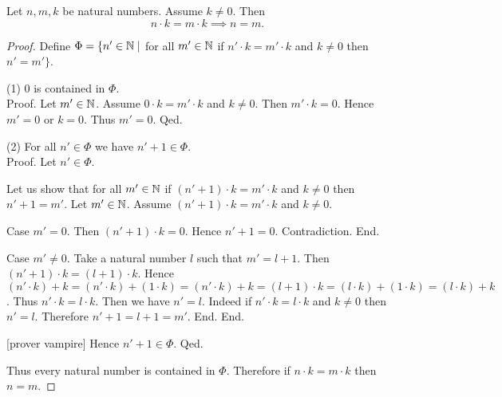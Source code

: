 \documentclass[../arithmetic.tex]{subfiles}
\begin{document}
  \begin{forthel}
    \begin{proposition}
      Let $n, m, k$ be natural numbers.
      Assume $k \neq 0$.
      Then \[ n \cdot k = m \cdot k \implies n = m. \]
    \end{proposition}
    \begin{proof}
      Define $\Phi = \{ n' \in \mathbb{N} \mid$ for all $m' \in \mathbb{N}$ if
      $n' \cdot k = m' \cdot k$ and $k \neq 0$ then $n' = m' \}$.

      (1) $0$ is contained in $\Phi$. \\
      Proof.
        Let $m' \in \mathbb{N}$.
        Assume $0 \cdot k = m' \cdot k$ and $k \neq 0$.
        Then $m' \cdot k = 0$.
        Hence $m' = 0$ or $k = 0$.
        Thus $m' = 0$.
      Qed.

      (2) For all $n' \in \Phi$ we have $n' \plus 1 \in \Phi$. \\
      Proof.
        Let $n' \in \Phi$.

        Let us show that for all $m' \in \mathbb{N}$ if $(n' \plus 1) \cdot k =
        m' \cdot k$ and $k \neq 0$ then $n' \plus 1 = m'$.
          Let $m' \in \mathbb{N}$.
          Assume $(n' \plus 1) \cdot k = m' \cdot k$ and $k \neq 0$.

          Case $m' = 0$.
            Then $(n' \plus 1) \cdot k = 0$.
            Hence $n' \plus 1 = 0$.
            Contradiction.
          End.

          Case $m' \neq 0$.
            Take a natural number $l$ such that $m' = l \plus 1$.
            Then $(n' \plus 1) \cdot k = (l \plus 1) \cdot k$.
            Hence $(n' \cdot k) \plus k
              = (n' \cdot k) \plus (1 \cdot k)
              = (n' \cdot k) \plus k
              = (l \plus 1) \cdot k
              = (l \cdot k) \plus (1 \cdot k)
              = (l \cdot k) \plus k$.
            Thus $n' \cdot k = l \cdot k$.
            Then we have $n' = l$.
            Indeed if $n' \cdot k = l \cdot k$ and $k \neq 0$ then $n' = l$.
            Therefore $n' \plus 1 = l \plus 1 = m'$.
          End.
        End.

        [prover vampire]
        Hence $n' \plus 1 \in \Phi$.
      Qed.

      Thus every natural number is contained in $\Phi$.
      Therefore if $n \cdot k = m \cdot k$ then $n = m$.
    \end{proof}
  \end{forthel}
\end{document}
